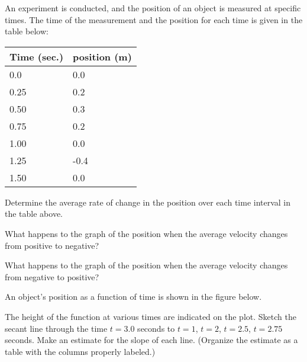 \begin{problem}
\item An experiment is conducted, and the position of an object is
  measured at specific times. The time of the measurement and the
  position for each time is given in the table below: \\
  \begin{tabular}{ll}
    Time (sec.) & position (m) \\ \hline
    0.0  & 0.0 \\
    0.25 & 0.2 \\
    0.50 & 0.3 \\
    0.75 & 0.2 \\
    1.00 & 0.0 \\
    1.25 & -0.4 \\
    1.50 & 0.0
  \end{tabular}
  \begin{subproblem}
  \item Determine the average rate of change in the position over each
    time interval in the table above.
    \vfill

  \item What happens to the graph of the position when the average
    velocity changes from positive to negative?  
    \vspace{2em}

  \item What happens to the graph of the position when the average
    velocity changes from negative to positive?
    \vspace{2em}

  \end{subproblem}

  \clearpage

  \item An object's position as a function of time is shown in the
    figure below. 

    \scalebox{0.5}{}

    \begin{subproblem}
    \item The height of the function at various times are indicated on
      the plot. Sketch the secant line through the time $t=3.0$
      seconds to $t=1$, $t=2$, $t=2.5$, $t=2.75$ seconds. Make an
      estimate for the slope of each line. (Organize the estimate as a
      table with the columns properly labeled.)

      \vfill


\end{subproblem}
\end{problem}
